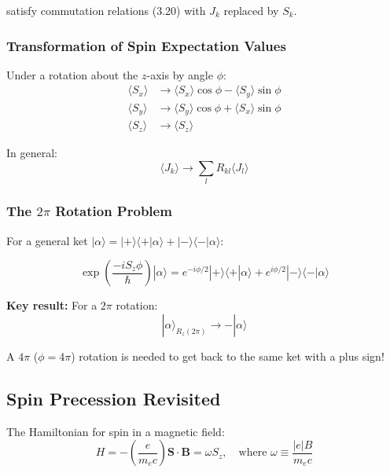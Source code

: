\documentclass[11pt,a4paper]{article}
\begin{document}
satisfy commutation relations (3.20) with $J_k$ replaced by $S_k$.

\subsubsection{Transformation of Spin Expectation Values}

Under a rotation about the $z$-axis by angle $\phi$:
\begin{align}
\langle S_x \rangle &\to \langle S_x \rangle\cos\phi - \langle S_y \rangle\sin\phi \tag{3.26} \\
\langle S_y \rangle &\to \langle S_y \rangle\cos\phi + \langle S_x \rangle\sin\phi \tag{3.27} \\
\langle S_z \rangle &\to \langle S_z \rangle \tag{3.28}
\end{align}

In general:
\begin{equation}
\langle J_k \rangle \to \sum_l R_{kl}\langle J_l \rangle
\tag{3.30}
\end{equation}

\subsubsection{The $2\pi$ Rotation Problem}

For a general ket $|\alpha\rangle = |+\rangle\langle+|\alpha\rangle + |-\rangle\langle-|\alpha\rangle$:

\begin{equation}
\exp\left(\frac{-iS_z\phi}{\hbar}\right)|\alpha\rangle = e^{-i\phi/2}|+\rangle\langle+|\alpha\rangle + e^{i\phi/2}|-\rangle\langle-|\alpha\rangle
\tag{3.32}
\end{equation}

\textbf{Key result:} For a $2\pi$ rotation:
\begin{equation}
\boxed{|\alpha\rangle_{R_z(2\pi)} \to -|\alpha\rangle}
\tag{3.33}
\end{equation}

A $4\pi$ ($\phi = 4\pi$) rotation is needed to get back to the same ket with a plus sign!

\subsection{Spin Precession Revisited}

The Hamiltonian for spin in a magnetic field:
\begin{equation}
H = -\left(\frac{e}{m_e c}\right)\mathbf{S}\cdot\mathbf{B} = \omega S_z, \quad \text{where } \omega \equiv \frac{|e|B}{m_e c}
\tag{3.34, 3.35}
\end{equation}
\end{document}
